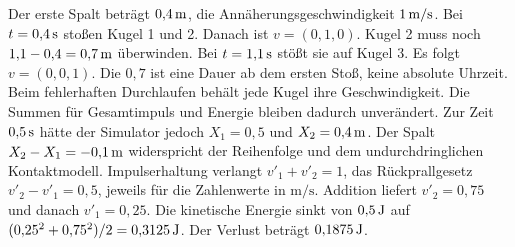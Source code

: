 

Der erste Spalt beträgt \(0{,}4\,\mathrm{m}\), die Annäherungsgeschwindigkeit \(1\,\mathrm{m/s}\). Bei \(t=0{,}4\,\mathrm{s}\) stoßen Kugel 1 und 2. Danach ist \(v=(0,1,0)\). Kugel 2 muss noch \(1{,}1-0{,}4=0{,}7\,\mathrm{m}\) überwinden. Bei \(t=1{,}1\,\mathrm{s}\) stößt sie auf Kugel 3. Es folgt \(v=(0,0,1)\). Die \(0{,}7\) ist eine Dauer ab dem ersten Stoß, keine absolute Uhrzeit.
Beim fehlerhaften Durchlaufen behält jede Kugel ihre Geschwindigkeit. Die Summen für Gesamtimpuls und Energie bleiben dadurch unverändert. Zur Zeit \(0{,}5\,\mathrm{s}\) hätte der Simulator jedoch \(X_1=0{,}5\) und \(X_2=0{,}4\,\mathrm{m}\). Der Spalt \(X_2-X_1=-0{,}1\,\mathrm{m}\) widerspricht der Reihenfolge und dem undurchdringlichen Kontaktmodell.
Impulserhaltung verlangt \(v'_1+v'_2=1\), das Rückprallgesetz \(v'_2-v'_1=0{,}5\), jeweils für die Zahlenwerte in \(\mathrm{m/s}\). Addition liefert \(v'_2=0{,}75\) und danach \(v'_1=0{,}25\). Die kinetische Energie sinkt von \(0{,}5\,\mathrm{J}\) auf \((0{,}25^2+0{,}75^2)/2=0{,}3125\,\mathrm{J}\). Der Verlust beträgt \(0{,}1875\,\mathrm{J}\).


